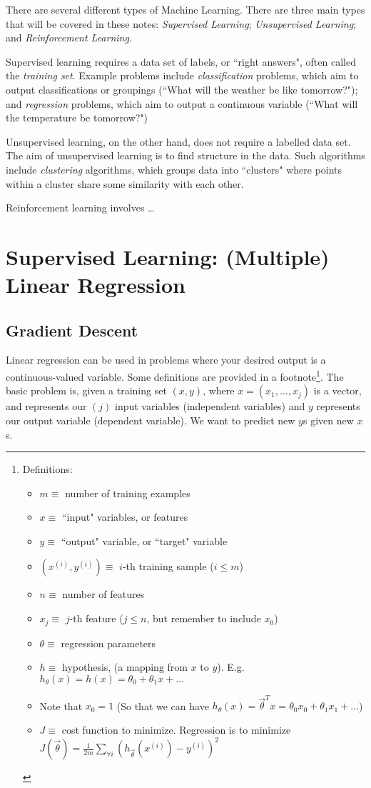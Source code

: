 \documentclass[letterpaper,10pt]{article}
\begin{document}
There are several different types of Machine Learning. There are three main types that will be covered in these notes: \textit{Supervised Learning}; \textit{Unsupervised Learning}; and \textit{Reinforcement Learning}.

Supervised learning requires a data set of labels, or ``right answers", often called the \textit{training set}. Example problems include \textit{classification} problems, which aim to output classifications or groupings (``What will the weather be like tomorrow?"); and \textit{regression} problems, which aim to output a continuous variable (``What will the temperature be tomorrow?")

Unsupervised learning, on the other hand, does not require a labelled data set. The aim of unsupervised learning is to find structure in the data. Such algorithms include \textit{clustering} algorithms, which groups data into ``clusters" where points within a cluster share some similarity with each other.

Reinforcement learning involves \ldots


\section{Supervised Learning: (Multiple) Linear Regression}

\subsection{Gradient Descent}
Linear regression can be used in problems where your desired output is a continuous-valued variable. Some definitions are provided in a footnote\footnote{Definitions:
\begin{itemize}
	\item $m \equiv$ number of training examples
	\item $x \equiv$ ``input" variables, or features
	\item $y \equiv$ ``output" variable, or ``target" variable
	\item $(x^{(i)},y^{(i)}) \equiv$ $i$-th training sample ($i \leq m$)
	\item $n \equiv$ number of features
	\item $x_j \equiv$ $j$-th feature ($j \leq n$, but remember to include $x_0$)
	\item $\theta \equiv$ regression parameters
	\item $h \equiv$ hypothesis, (a mapping from $x$ to $y$). E.g. $h_\theta (x) = h(x)= \theta_0 + \theta_1 x + \ldots$
	\item Note that $x_0 = 1$ (So that we can have $h_\theta (x) = \vec \theta^T x = \theta_0 x_0 + \theta_1 x_1 + \ldots $)
	\item $J \equiv$ cost function to minimize. Regression is to minimize $J(\vec \theta) = \frac{1}{2m} \sum_{\forall i} \left( h_{\vec \theta} (x^{(i)}) - y^{(i)} \right)^2$
\end{itemize}
}. The basic problem is, given a training set $(x,y)$, where $x=(x_1,\ldots,x_j)$ is a vector, and represents our $(j)$ input variables (independent variables) and $y$ represents our output variable (dependent variable). We want to predict new $y$s given new $x$s.
\end{document}
